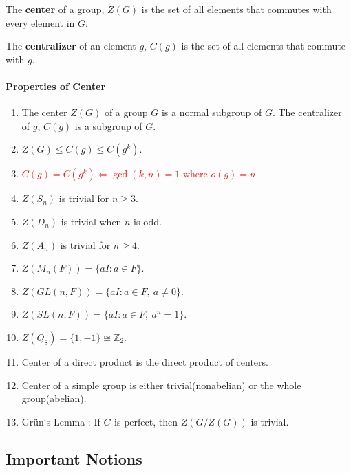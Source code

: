 \begin{definition}
	The \textbf{center} of a group, $Z(G)$ is the set of all elements that commutes with every element in $G$.
\end{definition}
\begin{definition}
	The \textbf{centralizer} of an element $g$, $C(g)$ is the set of all elements that commute with $g$.
\end{definition}
\paragraph{Properties of Center}
\begin{enumerate}
	\item The center $Z(G)$ of a group $G$ is a normal subgroup of $G$. The centralizer of $g$, $C(g)$ is a subgroup of $G$.
	\item $Z(G) \le C(g) \le C(g^k)$.
	\item \textcolor{red}{$C(g) = C(g^k) \iff \gcd(k,n) = 1$ where $o(g)=n$.}
	\item $Z(S_n)$ is trivial for $n \ge 3$.
	\item $Z(D_n)$ is trivial when $n$ is odd.
	\item $Z(A_n)$ is trivial for $n \ge 4$.
	\item $Z(M_n(F)) = \{ aI : a \in F \}$.
	\item $Z(GL(n,F)) = \{ aI : a \in F,\ a \ne 0 \}$.
	\item $Z(SL(n,F)) = \{ aI : a \in F,\ a^n = 1 \}$.
	\item $Z(Q_8) = \{ 1,-1 \} \cong \mathbb{Z}_2$.
	\item Center of a direct product is the direct product of centers.
	\item Center of a simple group is either trivial(nonabelian) or the whole group(abelian).
	\item Gr\"un`s Lemma : If $G$ is perfect, then $Z(G/Z(G))$ is trivial.
\end{enumerate}

\subsection*{Important Notions}
